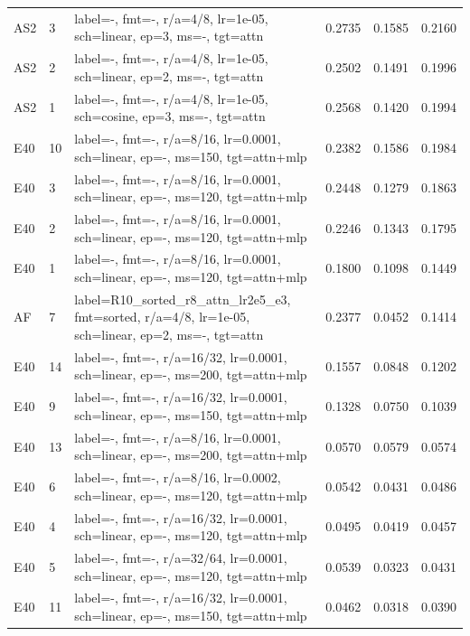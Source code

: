 \begin{longtable}{@{}llp{1.9in}rrr@{}}
AS2 & 3 & label=-, fmt=-, r/a=4/8, lr=1e-05, sch=linear, ep=3, ms=-, tgt=attn & 0.2735 & 0.1585 & 0.2160 \\
AS2 & 2 & label=-, fmt=-, r/a=4/8, lr=1e-05, sch=linear, ep=2, ms=-, tgt=attn & 0.2502 & 0.1491 & 0.1996 \\
AS2 & 1 & label=-, fmt=-, r/a=4/8, lr=1e-05, sch=cosine, ep=3, ms=-, tgt=attn & 0.2568 & 0.1420 & 0.1994 \\
E40 & 10 & label=-, fmt=-, r/a=8/16, lr=0.0001, sch=linear, ep=-, ms=150, tgt=attn+mlp & 0.2382 & 0.1586 & 0.1984 \\
E40 & 3 & label=-, fmt=-, r/a=8/16, lr=0.0001, sch=linear, ep=-, ms=120, tgt=attn+mlp & 0.2448 & 0.1279 & 0.1863 \\
E40 & 2 & label=-, fmt=-, r/a=8/16, lr=0.0001, sch=linear, ep=-, ms=120, tgt=attn+mlp & 0.2246 & 0.1343 & 0.1795 \\
E40 & 1 & label=-, fmt=-, r/a=8/16, lr=0.0001, sch=linear, ep=-, ms=120, tgt=attn+mlp & 0.1800 & 0.1098 & 0.1449 \\
AF & 7 & label=R10\_sorted\_r8\_attn\_lr2e5\_e3, fmt=sorted, r/a=4/8, lr=1e-05, sch=linear, ep=2, ms=-, tgt=attn & 0.2377 & 0.0452 & 0.1414 \\
E40 & 14 & label=-, fmt=-, r/a=16/32, lr=0.0001, sch=linear, ep=-, ms=200, tgt=attn+mlp & 0.1557 & 0.0848 & 0.1202 \\
E40 & 9 & label=-, fmt=-, r/a=16/32, lr=0.0001, sch=linear, ep=-, ms=150, tgt=attn+mlp & 0.1328 & 0.0750 & 0.1039 \\
E40 & 13 & label=-, fmt=-, r/a=8/16, lr=0.0001, sch=linear, ep=-, ms=200, tgt=attn+mlp & 0.0570 & 0.0579 & 0.0574 \\
E40 & 6 & label=-, fmt=-, r/a=8/16, lr=0.0002, sch=linear, ep=-, ms=120, tgt=attn+mlp & 0.0542 & 0.0431 & 0.0486 \\
E40 & 4 & label=-, fmt=-, r/a=16/32, lr=0.0001, sch=linear, ep=-, ms=120, tgt=attn+mlp & 0.0495 & 0.0419 & 0.0457 \\
E40 & 5 & label=-, fmt=-, r/a=32/64, lr=0.0001, sch=linear, ep=-, ms=120, tgt=attn+mlp & 0.0539 & 0.0323 & 0.0431 \\
E40 & 11 & label=-, fmt=-, r/a=16/32, lr=0.0001, sch=linear, ep=-, ms=150, tgt=attn+mlp & 0.0462 & 0.0318 & 0.0390 \\
\bottomrule
\end{longtable}
\normalsize
